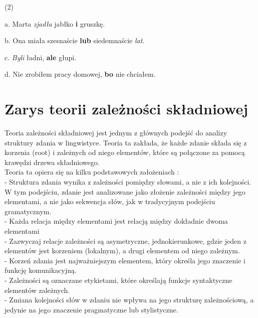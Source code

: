 \documentclass[licencjacka]{pracamgr_Kogni}
\begin{document}
(2)

a. Marta \textit{zjadła} jabłko \textbf{i} gruszkę.

b. Ona miała szesnaście \textbf{lub} siedemnaście \textit{lat}.

c. \textit{Byli} ładni, \textbf{ale} głupi.

d. Nie zrobiłem pracy domowej, \textbf{bo} nie chciałem.

\section{Zarys teorii zależności składniowej}
Teoria zależności składniowej jest jednym z głównych podejść do analizy struktury zdania w lingwistyce. Teoria ta zakłada, że każde zdanie składa się z korzenia (root) i zależnych od niego elementów, które są połączone za pomocą krawędzi drzewa składniowego.\\
Teoria ta opiera się na kilku podstawowych założeniach \citep{Liu2008}:\\
- Struktura zdania wynika z zależności pomiędzy słowami, a nie z ich kolejności. W tym podejściu, zdanie jest analizowane jako złożenie zależności między jego elementami, a nie jako sekwencja słów, jak w tradycyjnym podejściu gramatycznym.\\
- Każda relacja między elementami jest relacją między dokładnie dwoma elementami\\
- Zazwyczaj relacje zależności są asymetryczne, jednokierunkowe, gdzie jeden z elementów jest korzeniem (lokalnym), a drugi elementem od niego zależnym.\\
- Korzeń zdania jest najważniejszym elementem, który określa jego znaczenie i funkcję komunikacyjną. \\
- Zależności są oznaczane etykietami, które określają funkcje syntaktyczne elementów zależnych.\\
- Zmiana kolejności słów w zdaniu nie wpływa na jego strukturę zależnościową, a jedynie na jego znaczenie pragmatyczne lub stylistyczne.
\\
\end{document}
